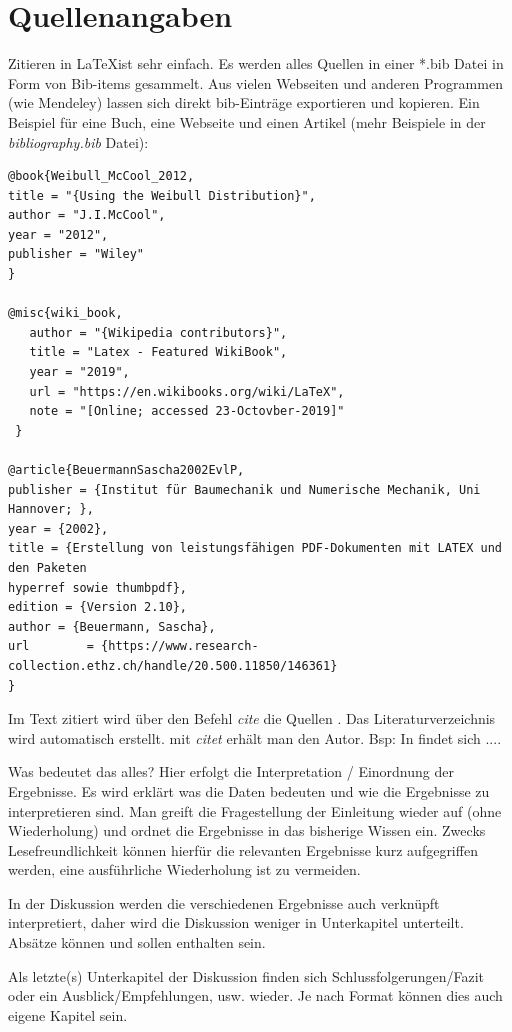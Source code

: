 \section{Quellenangaben}
Zitieren in \LaTeX ist sehr einfach. Es werden alles Quellen in einer *.bib Datei in Form von Bib-items gesammelt. Aus vielen Webseiten und anderen Programmen (wie Mendeley) lassen sich direkt bib-Einträge exportieren und kopieren. Ein Beispiel für eine Buch, eine Webseite und einen Artikel (mehr Beispiele in der {\em bibliography.bib} Datei):
\begin{verbatim}
@book{Weibull_McCool_2012,
title = "{Using the Weibull Distribution}",
author = "J.I.McCool",
year = "2012",
publisher = "Wiley"
}

@misc{wiki_book,
   author = "{Wikipedia contributors}",
   title = "Latex - Featured WikiBook",
   year = "2019",
   url = "https://en.wikibooks.org/wiki/LaTeX",
   note = "[Online; accessed 23-Octovber-2019]"
 }

@article{BeuermannSascha2002EvlP,
publisher = {Institut für Baumechanik und Numerische Mechanik, Uni Hannover; },
year = {2002},
title = {Erstellung von leistungsfähigen PDF-Dokumenten mit LATEX und den Paketen 
hyperref sowie thumbpdf},
edition = {Version 2.10},
author = {Beuermann, Sascha},
url        = {https://www.research-collection.ethz.ch/handle/20.500.11850/146361}
}
\end{verbatim}
Im Text zitiert wird über den Befehl {\em cite} die Quellen \cite{Weibull_McCool_2012,wiki_book,BeuermannSascha2002EvlP,Leigh-Phoenix-Beyerlein_2000}. Das Literaturverzeichnis wird automatisch erstellt. mit {\em citet} erhält man den Autor. Bsp: In \citet{BeuermannSascha2002EvlP} findet sich ....


Was bedeutet das alles? Hier erfolgt die Interpretation / Einordnung der Ergebnisse. Es wird erklärt was die Daten bedeuten und wie die Ergebnisse zu interpretieren sind. Man greift die Fragestellung der Einleitung wieder auf (ohne Wiederholung) und ordnet die Ergebnisse in das bisherige Wissen ein. Zwecks Lesefreundlichkeit können hierfür die relevanten Ergebnisse kurz aufgegriffen werden, eine ausführliche Wiederholung ist zu vermeiden. 

In der Diskussion werden die verschiedenen Ergebnisse auch verknüpft interpretiert, daher wird die Diskussion weniger in Unterkapitel unterteilt. Absätze können und sollen enthalten sein.

Als letzte(s) Unterkapitel der Diskussion finden sich Schlussfolgerungen/Fazit oder ein Ausblick/Empfehlungen, usw. wieder. Je nach Format können dies auch eigene Kapitel sein. 

